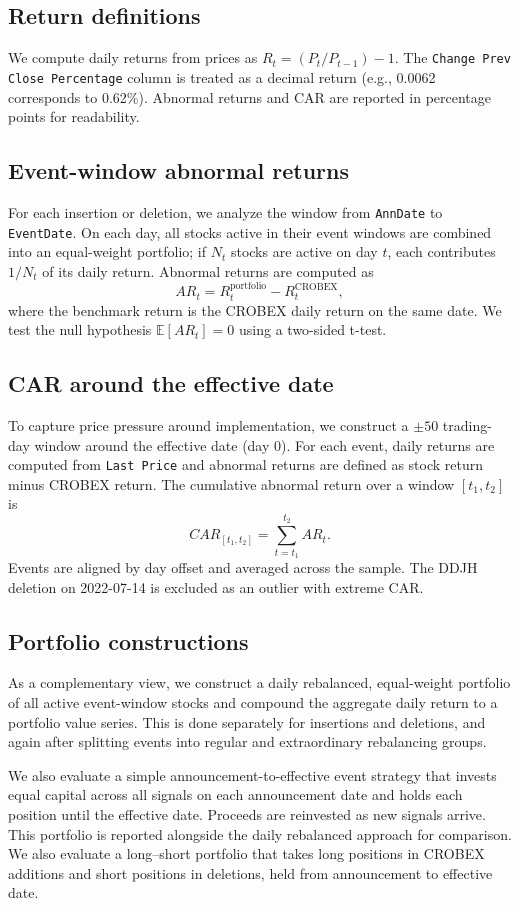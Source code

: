 \documentclass{article}
\begin{document}
\subsection{Return definitions}
We compute daily returns from prices as \(R_t = (P_t/P_{t-1}) - 1\). The \texttt{Change Prev Close Percentage} column is treated as a decimal return (e.g., 0.0062 corresponds to 0.62\%). Abnormal returns and CAR are reported in percentage points for readability.

\subsection{Event-window abnormal returns}
For each insertion or deletion, we analyze the window from \texttt{AnnDate} to \texttt{EventDate}. On each day, all stocks active in their event windows are combined into an equal-weight portfolio; if $N_t$ stocks are active on day $t$, each contributes $1/N_t$ of its daily return. Abnormal returns are computed as
\[
AR_t = R^{\text{portfolio}}_t - R^{\text{CROBEX}}_t,
\]
where the benchmark return is the CROBEX daily return on the same date. We test the null hypothesis $\mathbb{E}[AR_t]=0$ using a two-sided t-test.

\subsection{CAR around the effective date}
To capture price pressure around implementation, we construct a $\pm 50$ trading-day window around the effective date (day 0). For each event, daily returns are computed from \texttt{Last Price} and abnormal returns are defined as stock return minus CROBEX return. The cumulative abnormal return over a window $[t_1, t_2]$ is
\[
CAR_{[t_1, t_2]} = \sum_{t=t_1}^{t_2} AR_t.
\]
Events are aligned by day offset and averaged across the sample. The DDJH deletion on 2022-07-14 is excluded as an outlier with extreme CAR.

\subsection{Portfolio constructions}
As a complementary view, we construct a daily rebalanced, equal-weight portfolio of all active event-window stocks and compound the aggregate daily return to a portfolio value series. This is done separately for insertions and deletions, and again after splitting events into regular and extraordinary rebalancing groups.

We also evaluate a simple announcement-to-effective event strategy that invests equal capital across all signals on each announcement date and holds each position until the effective date. Proceeds are reinvested as new signals arrive. This portfolio is reported alongside the daily rebalanced approach for comparison. We also evaluate a long–short portfolio that takes long positions in CROBEX additions and short positions in deletions, held from announcement to effective date.
\end{document}
